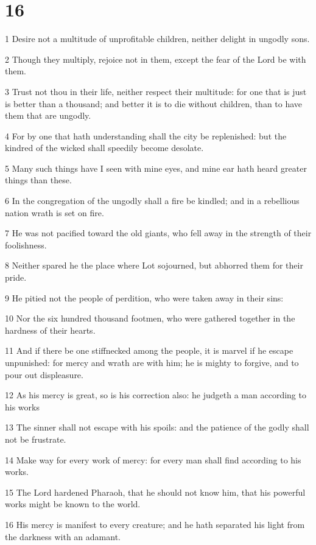 \chapter{16}

\par 1 Desire not a multitude of unprofitable children, neither delight in ungodly sons.
\par 2 Though they multiply, rejoice not in them, except the fear of the Lord be with them.
\par 3 Trust not thou in their life, neither respect their multitude: for one that is just is better than a thousand; and better it is to die without children, than to have them that are ungodly.
\par 4 For by one that hath understanding shall the city be replenished: but the kindred of the wicked shall speedily become desolate.
\par 5 Many such things have I seen with mine eyes, and mine ear hath heard greater things than these.
\par 6 In the congregation of the ungodly shall a fire be kindled; and in a rebellious nation wrath is set on fire.
\par 7 He was not pacified toward the old giants, who fell away in the strength of their foolishness.
\par 8 Neither spared he the place where Lot sojourned, but abhorred them for their pride.
\par 9 He pitied not the people of perdition, who were taken away in their sins:
\par 10 Nor the six hundred thousand footmen, who were gathered together in the hardness of their hearts.
\par 11 And if there be one stiffnecked among the people, it is marvel if he escape unpunished: for mercy and wrath are with him; he is mighty to forgive, and to pour out displeasure.
\par 12 As his mercy is great, so is his correction also: he judgeth a man according to his works
\par 13 The sinner shall not escape with his spoils: and the patience of the godly shall not be frustrate.
\par 14 Make way for every work of mercy: for every man shall find according to his works.
\par 15 The Lord hardened Pharaoh, that he should not know him, that his powerful works might be known to the world.
\par 16 His mercy is manifest to every creature; and he hath separated his light from the darkness with an adamant.
